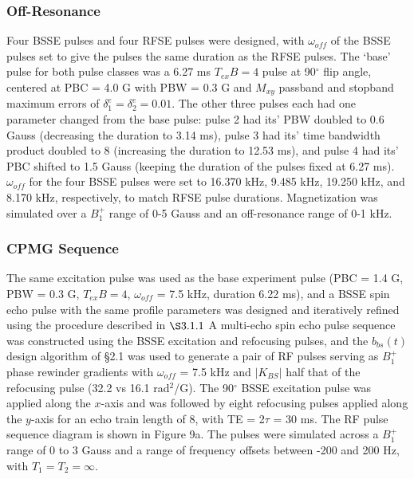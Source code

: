 \documentclass{article}
\newcommand{\bbst}{b_{bs}(t)}
\begin{document}
\subsubsection*{Off-Resonance}
Four BSSE pulses and four RFSE pulses were designed,
with $\omega_{off}$ of the BSSE pulses set to give the pulses the same duration as the RFSE pulses. 
The `base' pulse for both pulse classes was a 6.27 ms $T_{ex}B = 4$ pulse at 90$^\circ$ flip angle, 
centered at PBC = 4.0 G with PBW = 0.3 G and $M_{xy}$ passband and stopband maximum errors of 
$\delta_1^e = \delta_2^e = 0.01$.
The other three pulses each had one parameter changed from the base pulse: 
pulse 2 had its' PBW doubled to 0.6 Gauss (decreasing the duration to 3.14 ms), 
pulse 3 had its' time bandwidth product doubled to 8 (increasing the duration to 12.53 ms),
and pulse 4 had its' PBC shifted to 1.5 Gauss (keeping the duration of the pulses fixed at 6.27 ms). 
$\omega_{off}$ for the four BSSE pulses were set to 16.370 kHz, 9.485 kHz, 19.250 kHz, and 8.170 kHz, respectively,
to match RFSE pulse durations. 
Magnetization was simulated over a $B_1^+$ range of 0-5 Gauss and an off-resonance range of 0-1 kHz.

\subsubsection*{CPMG Sequence}
The same excitation pulse was used as the base experiment pulse (PBC = 1.4 G, PBW = 0.3 G, $T_{ex}B=4$, $\omega_{off}$ = 7.5 kHz, duration 6.22 ms), 
and a BSSE spin echo pulse with the same profile parameters was designed and iteratively refined using the procedure described in $\S 3.1.1$
A multi-echo spin echo pulse sequence was constructed using the BSSE excitation and refocusing pulses, 
and the $\bbst$ 
design algorithm of \S 2.1 was used to generate a pair of RF pulses serving as $B_1^+$ phase rewinder gradients with $\omega_{off}$ = 7.5 kHz and $|K_{BS}|$ half that of the refocusing pulse (32.2 vs 16.1 rad$^2$/G).
The 90$^\circ$ BSSE excitation pulse was applied along the $x$-axis and was followed by eight refocusing pulses applied along the $y$-axis for an echo train length of 8, with TE = 2$\tau$ = 30 ms. The RF pulse sequence diagram is shown in Figure 9a.
The pulses were simulated across a $B_1^+$ range of 0 to 3 Gauss and
a range of frequency offsets between -200 and 200 Hz, 
with $T_1 = T_2 = \infty$. 
\end{document}
